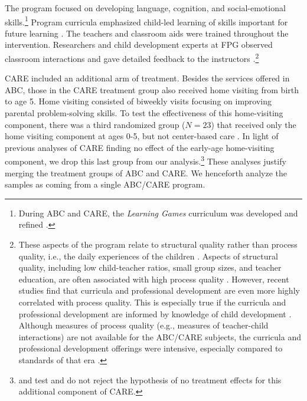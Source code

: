 The program focused on developing language, cognition, and social-emotional skills.\footnote{During ABC and CARE, the \textit{Learning Games} curriculum was developed and refined \citep{Sparling_Lewis_1979_BOOKLearninggamesFirstThree,Sparling_Lewis_1984_BOOKLearningGamesThreesFours}.} Program curricula emphasized child-led learning of skills important for future learning \citep{Ramey_Smith_1977_AJMD, Wasik_Ramey_etal_1990_CD, Ramey_Campbell_1991_childreninpoverty}. The teachers and classroom aids were trained throughout the intervention. Researchers and child development experts at FPG observed classroom interactions and gave detailed feedback to the instructors \citep{Ramey-etal_2012-ABC}.\footnote{These aspects of the program relate to structural quality rather than process quality, i.e., the daily experiences of the children \citep{Thomason_LaParo_2009_EED}. Aspects of structural quality, including low child-teacher ratios, small group sizes, and teacher education, are often associated with high process quality \citep{Phillipsen_etal_1997_ECRQ}. However, recent studies find that curricula and professional development are even more highly correlated with process quality. This is especially true if the curricula and professional development are informed by knowledge of child development \citep{Slot_etal_2015_Dutch_ECRQ}. Although measures of process quality (e.g., measures of teacher-child interactions) are not available for the ABC/CARE subjects, the curricula and professional development offerings were intensive, especially compared to standards of that era \citep{Burchinal_etal_1989_CD_Daycare-Pre-K-Dev}.}

CARE included an additional arm of treatment. Besides the services offered in ABC, those in the CARE treatment group also received home visiting from birth to age 5. Home visiting consisted of biweekly visits focusing on improving parental problem-solving skills. To test the effectiveness of this home-visiting component, there was a third randomized group ($N=23$) that received only the home visiting component at ages 0-5, but not center-based care \citep{Wasik_Ramey_etal_1990_CD}. In light of previous analyses of CARE finding no effect of the early-age home-visiting component, we drop this last group from our analysis.\footnote{\citet{Campbell_Conti_etal_2014_EarlyChildhoodInvestments} and \citet{Burchinal_etal_2006_MSRCD_IV-Growth-Curve} test and do not reject the hypothesis of no treatment effects for this additional component of CARE.} These analyses justify merging the treatment groups of ABC and CARE. We henceforth analyze the samples as coming from a single ABC/CARE program.


